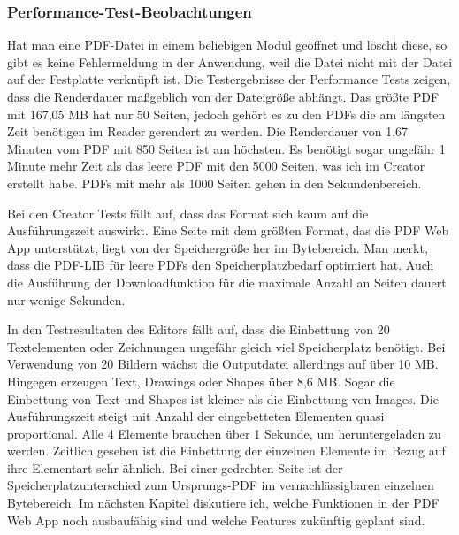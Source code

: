 \subsubsection{Performance-Test-Beobachtungen}
Hat man eine PDF-Datei in einem beliebigen Modul geöffnet und löscht diese, so gibt es keine Fehlermeldung in der Anwendung, weil die Datei nicht mit der Datei auf der Festplatte verknüpft ist. Die Testergebnisse der Performance Tests zeigen, dass die Renderdauer maßgeblich von der Dateigröße abhängt. Das größte PDF mit 167,05 MB hat nur 50 Seiten, jedoch gehört es zu den PDFs die am längsten Zeit benötigen im Reader gerendert zu werden. Die Renderdauer von 1,67 Minuten vom PDF mit 850 Seiten ist am höchsten. Es benötigt sogar ungefähr 1 Minute mehr Zeit als das leere PDF mit den 5000 Seiten, was ich im Creator erstellt habe. PDFs mit mehr als 1000 Seiten gehen in den Sekundenbereich.
\par 
Bei den Creator Tests fällt auf, dass das Format sich kaum auf die Ausführungszeit auswirkt. Eine Seite mit dem größten Format, das die PDF Web App unterstützt, liegt von der Speichergröße her im Bytebereich. Man merkt, dass die PDF-LIB für leere PDFs den Speicherplatzbedarf optimiert hat. Auch die Ausführung der Downloadfunktion für die maximale Anzahl an Seiten dauert nur wenige Sekunden. 
\par
In den Testresultaten des Editors fällt auf, dass die Einbettung von 20 Textelementen oder Zeichnungen ungefähr gleich viel Speicherplatz benötigt. Bei Verwendung von 20 Bildern wächst die Outputdatei allerdings auf über 10 MB. Hingegen erzeugen Text, Drawings oder Shapes über 8,6 MB. Sogar die Einbettung von Text und Shapes ist kleiner als die Einbettung von Images. Die Ausführungszeit steigt mit Anzahl der eingebetteten Elementen quasi proportional. Alle 4 Elemente brauchen über 1 Sekunde, um heruntergeladen zu werden. Zeitlich gesehen ist die Einbettung der einzelnen Elemente im Bezug auf ihre Elementart sehr ähnlich. Bei einer gedrehten Seite ist der Speicherplatzunterschied zum Ursprungs-PDF im vernachlässigbaren einzelnen Bytebereich. Im nächsten Kapitel diskutiere ich, welche Funktionen in der PDF Web App noch ausbaufähig sind und welche Features zukünftig geplant sind.
